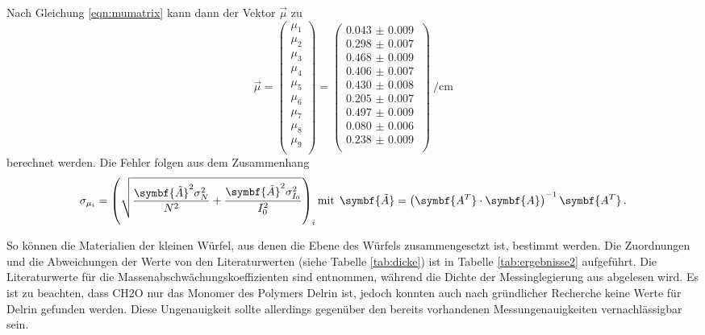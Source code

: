 Nach Gleichung \eqref{eqn:mumatrix} kann dann der Vektor $\vec{\mu}$ zu
\begin{equation*}
  \vec{\mu}=
  \left(
      \begin{array}{r}
        \mu_1 \\
        \mu_2 \\
        \mu_3 \\
        \mu_4 \\
        \mu_5 \\
        \mu_6 \\
        \mu_7 \\
        \mu_8 \\
        \mu_9 \\
      \end{array}
      \right)=
  \left(
      \begin{array}{r}
        \SI{0.043(9)}{} \\
        \SI{0.298(7)}{} \\
        \SI{0.468(9)}{} \\
        \SI{0.406(7)}{} \\
        \SI{0.430(8)}{} \\
        \SI{0.205(7)}{} \\
        \SI{0.497(9)}{} \\
        \SI{0.080(6)}{} \\
        \SI{0.238(9)}{} \\
      \end{array}
      \right)
      \SI{}{\per\centi\meter}
\end{equation*}
berechnet werden. Die Fehler folgen aus dem Zusammenhang
\begin{equation}
  \sigma_{\mu_i} = \left(\sqrt{\frac{\symbf{\tilde{A}}^2 \sigma_{N}^2}{N^2} + \frac{\symbf{\tilde{A}}^{2} \sigma_{I_{0}}^2}{I_{0}^2}}\right)_i \\
  \text{mit}\:\: \symbf{\tilde{A}} = \left(\symbf{A^T} \cdot \symbf{A}\right)^{-1} \symbf{A^T}\,.
\end{equation}

So können die Materialien der kleinen Würfel, aus denen die Ebene des Würfels zusammengesetzt ist, bestimmt werden. Die Zuordnungen und die Abweichungen der Werte von den Literaturwerten (siehe Tabelle \ref{tab:dicke}) ist in Tabelle \ref{tab:ergebnisse2} aufgeführt.
Die Literaturwerte für die Massenabschwächungskoeffizienten sind \cite{datenbank} entnommen, während die Dichte der Messinglegierung aus \cite{messing} abgelesen wird.
Es ist zu beachten, dass CH2O nur das Monomer des Polymers Delrin ist, jedoch konnten auch nach gründlicher Recherche keine Werte für Delrin gefunden werden. Diese Ungenauigkeit sollte allerdings gegenüber den bereits vorhandenen Messungenauigkeiten vernachlässigbar sein.


